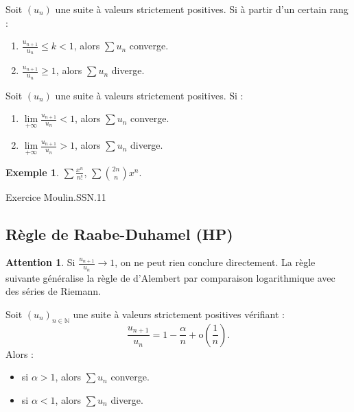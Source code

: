 \documentclass[french]{article}
\newcommand{\N}{\mathbb{N}}
\renewcommand{\o}{\text{o}}
\theoremstyle{plain}
\theoremstyle{definition}
\newtheorem*{ex}{Exemple}
\newtheorem*{attention}{Attention}
\theoremstyle{remark}
\begin{document}
\begin{cor}%
	Soit $(u_n)$ une suite à valeurs strictement positives. Si à partir d'un certain rang :
	\begin{enumerate}
		\item $\displaystyle\frac{u_{n+1}}{u_n}\leqslant k<1$, alors $\displaystyle\sum u_n$ converge.
		\item $\displaystyle\frac{u_{n+1}}{u_n}\geqslant 1$, alors $\displaystyle\sum u_n$ diverge.
	\end{enumerate}
\end{cor}

\begin{cor}%
	Soit $(u_n)$ une suite à valeurs strictement positives. Si :
	\begin{enumerate}
		\item $\displaystyle\underset{+\infty}{\lim}\frac{u_{n+1}}{u_n}<1$, alors $\displaystyle\sum u_n$ converge.
		\item $\displaystyle\underset{+\infty}{\lim}\frac{u_{n+1}}{u_n}>1$, alors $\displaystyle\sum u_n$ diverge.
	\end{enumerate}
\end{cor}

\begin{ex}%
	$\displaystyle\sum\frac{x^n}{n!}$, $\displaystyle\sum\binom{2n}{n}x^n$.
\end{ex}

Exercice Moulin.SSN.11

\subsection{Règle de Raabe-Duhamel (HP)}

\begin{attention}
	Si $\displaystyle\frac{u_{n+1}}{u_n}\to 1$, on ne peut rien conclure directement. La règle suivante généralise la règle de d'Alembert par comparaison logarithmique avec des séries de Riemann.
\end{attention}

\begin{prop}%
	Soit $(u_n)_{n\in\N}$ une suite à valeurs strictement positives vérifiant :
	$$\frac{u_{n+1}}{u_n}=1-\frac{\alpha}{n}+\o\left(\frac{1}{n}\right).$$
	Alors :
	\begin{itemize}
		\item si $\alpha>1$, alors $\displaystyle\sum u_n$ converge.
		\item si $\alpha<1$, alors $\displaystyle\sum u_n$ diverge.
	\end{itemize}
\end{prop}
\end{document}
